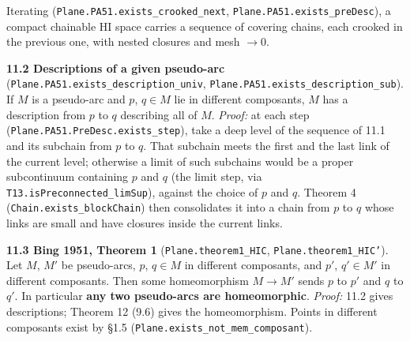 \documentclass[11pt]{article}
\newcommand{\lean}[1]{\texttt{#1}}
\begin{document}
Iterating (\lean{Plane.\hspace{0pt}PA51.\hspace{0pt}exists\_\hspace{0pt}crooked\_\hspace{0pt}next}, \lean{Plane.\hspace{0pt}PA51.\hspace{0pt}exists\_\hspace{0pt}preDesc}), a compact chainable HI space carries a sequence of covering chains, each crooked in the previous one, with nested closures and mesh $\to 0$.

\textbf{11.2 Descriptions of a given pseudo-arc} (\lean{Plane.\hspace{0pt}PA51.\hspace{0pt}exists\_\hspace{0pt}description\_\hspace{0pt}univ}, \lean{Plane.\hspace{0pt}PA51.\hspace{0pt}exists\_\hspace{0pt}description\_\hspace{0pt}sub}). If $M$ is a pseudo-arc and $p$, $q \in M$ lie in different composants, $M$ has a description from $p$ to $q$ describing all of $M$. \emph{Proof:} at each step (\lean{Plane.\hspace{0pt}PA51.\hspace{0pt}PreDesc.\hspace{0pt}exists\_\hspace{0pt}step}), take a deep level of the sequence of 11.1 and its subchain from $p$ to $q$. That subchain meets the first and the last link of the current level; otherwise a limit of such subchains would be a proper subcontinuum containing $p$ and $q$ (the limit step, via \lean{T13.\hspace{0pt}isPreconnected\_\hspace{0pt}limSup}), against the choice of $p$ and $q$. Theorem 4 (\lean{Chain.\hspace{0pt}exists\_\hspace{0pt}blockChain}) then consolidates it into a chain from $p$ to $q$ whose links are small and have closures inside the current links.

\textbf{11.3 Bing 1951, Theorem 1} (\lean{Plane.\hspace{0pt}theorem1\_\hspace{0pt}HIC}, \lean{Plane.\hspace{0pt}theorem1\_\hspace{0pt}HIC'}). Let $M$, $M'$ be pseudo-arcs, $p$, $q \in M$ in different composants, and $p'$, $q' \in M'$ in different composants. Then some homeomorphism $M \to M'$ sends $p$ to $p'$ and $q$ to $q'$. In particular \textbf{any two pseudo-arcs are homeomorphic}. \emph{Proof:} 11.2 gives descriptions; Theorem 12 (9.6) gives the homeomorphism. Points in different composants exist by \S{}1.5 (\lean{Plane.\hspace{0pt}exists\_\hspace{0pt}not\_\hspace{0pt}mem\_\hspace{0pt}composant}).
\end{document}
